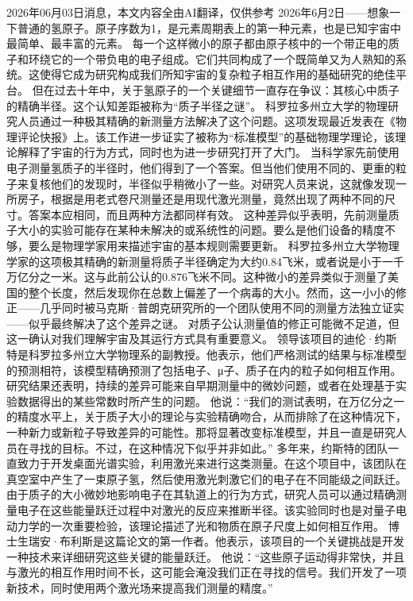 \documentclass[12pt,a4paper]{ctexart}
\begin{document}
2026年06月03日消息，本文内容全由AI翻译，仅供参考
2026年6月2日——想象一下普通的氢原子。原子序数为1，是元素周期表上的第一种元素，也是已知宇宙中最简单、最丰富的元素。
每一个这样微小的原子都由原子核中的一个带正电的质子和环绕它的一个带负电的电子组成。它们共同构成了一个既简单又为人熟知的系统。这使得它成为研究构成我们所知宇宙的复杂粒子相互作用的基础研究的绝佳平台。
但在过去十年中，关于氢原子的一个关键细节一直存在争议：其核心中质子的精确半径。这个认知差距被称为“质子半径之谜”。
科罗拉多州立大学的物理研究人员通过一种极其精确的新测量方法解决了这个问题。这项发现最近发表在《物理评论快报》上。该工作进一步证实了被称为“标准模型”的基础物理学理论，该理论解释了宇宙的行为方式，同时也为进一步研究打开了大门。
当科学家先前使用电子测量氢质子的半径时，他们得到了一个答案。但当他们使用不同的、更重的粒子来复核他们的发现时，半径似乎稍微小了一些。对研究人员来说，这就像发现一所房子，根据是用老式卷尺测量还是用现代激光测量，竟然出现了两种不同的尺寸。答案本应相同，而且两种方法都同样有效。
这种差异似乎表明，先前测量质子大小的实验可能存在某种未解决的或系统性的问题。要么是他们设备的精度不够，要么是物理学家用来描述宇宙的基本规则需要更新。
科罗拉多州立大学物理学家的这项极其精确的新测量将质子半径确定为大约0.84飞米，或者说是小于一千万亿分之一米。这与此前公认的0.876飞米不同。这种微小的差异类似于测量了美国的整个长度，然后发现你在总数上偏差了一个病毒的大小。然而，这一小小的修正——几乎同时被马克斯·普朗克研究所的一个团队使用不同的测量方法独立证实——似乎最终解决了这个差异之谜。
对质子公认测量值的修正可能微不足道，但这一确认对我们理解宇宙及其运行方式具有重要意义。
领导该项目的迪伦·约斯特是科罗拉多州立大学物理系的副教授。他表示，他们严格测试的结果与标准模型的预测相符，该模型精确预测了包括电子、μ子、质子在内的粒子如何相互作用。研究结果还表明，持续的差异可能来自早期测量中的微妙问题，或者在处理基于实验数据得出的某些常数时所产生的问题。
他说：“我们的测试表明，在万亿分之一的精度水平上，关于质子大小的理论与实验精确吻合，从而排除了在这种情况下，一种新力或新粒子导致差异的可能性。那将显著改变标准模型，并且一直是研究人员在寻找的目标。不过，在这种情况下似乎并非如此。”
多年来，约斯特的团队一直致力于开发桌面光谱实验，利用激光来进行这类测量。在这个项目中，该团队在真空室中产生了一束原子氢，然后使用激光刺激它们的电子在不同能级之间跃迁。由于质子的大小微妙地影响电子在其轨道上的行为方式，研究人员可以通过精确测量电子在这些能量跃迁过程中对激光的反应来推断半径。该实验同时也是对量子电动力学的一次重要检验，该理论描述了光和物质在原子尺度上如何相互作用。
博士生瑞安·布利斯是这篇论文的第一作者。他表示，该项目的一个关键挑战是开发一种技术来详细研究这些关键的能量跃迁。
他说：“这些原子运动得非常快，并且与激光的相互作用时间不长，这可能会淹没我们正在寻找的信号。我们开发了一项新技术，同时使用两个激光场来提高我们测量的精度。”
\end{document}
